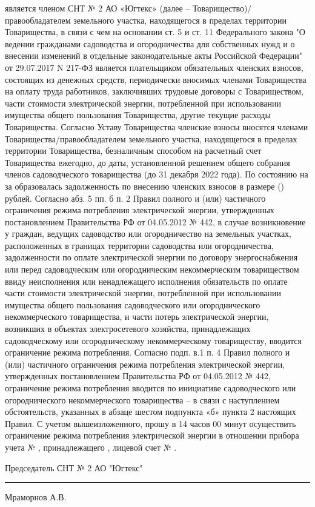  является членом СНТ № 2 АО «Югтекс» (далее – Товарищество)/правообладателем земельного участка, находящегося в пределах территории Товарищества, в связи с чем на основании ст. 5 и ст. 11    Федерального закона "О ведении гражданами садоводства и огородничества для собственных нужд и о внесении изменений в отдельные законодательные акты Российской Федерации" от 29.07.2017 N 217-ФЗ является плательщиком обязательных членских взносов, состоящих из денежных средств, периодически вносимых членами Товарищества на оплату труда работников, заключивших трудовые договоры с Товариществом, части стоимости электрической энергии, потребленной при использовании имущества общего пользования Товарищества,
другие текущие расходы Товарищества. 
Согласно Уставу Товарищества членские взносы вносятся членами Товарищества/правообладателем земельного участка, находящегося в пределах территории Товарищества, безналичным способом на расчетный счет Товарищества ежегодно, до даты, установленной решением общего собрания членов садоводческого товарищества    (до 31  декабря 2022 года). 
По состоянию на  за  образовалась задолженность по внесению членских взносов в размере  () рублей.
Согласно абз. 5 пп. б п. 2 Правил полного и (или) частичного ограничения режима потребления электрической энергии, утвержденных постановлением Правительства РФ от 04.05.2012 № 442, в случае возникновение у граждан, ведущих садоводство или огородничество на земельных участках, расположенных в границах территории садоводства или огородничества, задолженности по оплате электрической энергии по договору энергоснабжения или перед садоводческим или огородническим некоммерческим товариществом ввиду неисполнения или ненадлежащего исполнения обязательств по оплате части стоимости электрической энергии, потребленной при использовании имущества общего пользования садоводческого или огороднического некоммерческого товарищества, и части потерь электрической энергии, возникших в объектах электросетевого хозяйства, принадлежащих садоводческому или огородническому некоммерческому товариществу, вводится ограничение режима потребления.
Согласно подп. в.1 п. 4 Правил полного и (или) частичного ограничения режима потребления электрической энергии, утвержденных постановлением Правительства РФ от 04.05.2012 № 442, ограничение режима потребления вводится по инициативе садоводческого или огороднического некоммерческого товарищества – в связи с наступлением обстоятельств, указанных в абзаце шестом подпункта «б» пункта 2 настоящих Правил.
С учетом вышеизложенного,  прошу в 14 часов 00 минут   осуществить ограничение режима потребления электрической энергии в отношении прибора учета  №  , принадлежащего , лицевой счет № . 

\vspace{5mm}



\vspace{15mm}
\noindent Председатель СНТ № 2 АО "Югтекс" \hfill    \rule{3cm}{0.1 mm}    Мраморнов А.В.